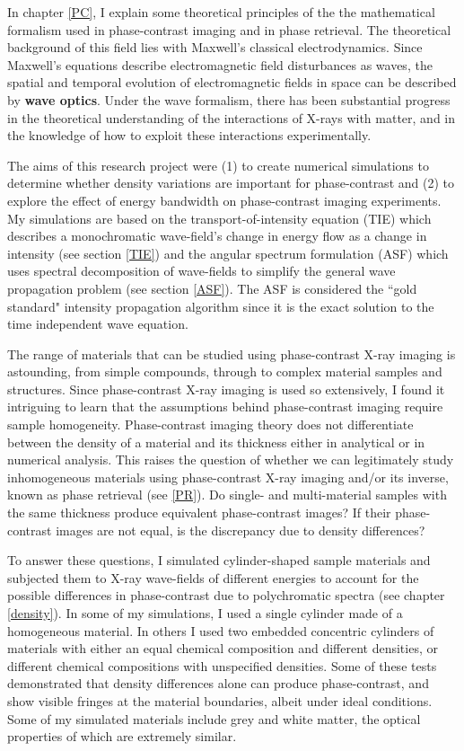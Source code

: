 \documentclass[10pt, a4paper, singlespacing]{report}
\begin{document}
In chapter \ref{PC}, I explain some theoretical principles of the the mathematical formalism used in phase-contrast imaging and in phase retrieval. The theoretical background of this field lies with Maxwell's classical electrodynamics\cite{PagsTutes}. Since Maxwell's equations describe electromagnetic field disturbances as waves, the spatial and temporal evolution of electromagnetic ﬁelds in space can be described by \textbf{wave optics}. Under the wave formalism, there has been substantial progress in the theoretical understanding of the interactions of X-rays with matter, and in the knowledge of how to exploit these interactions experimentally.

The aims of this research project were (1) to create numerical simulations to determine whether density variations are important for phase-contrast and (2) to explore the effect of energy bandwidth on phase-contrast imaging experiments. My simulations are based on the transport-of-intensity equation (TIE) which describes a monochromatic wave-field's change in energy flow as a change in intensity (see section \ref{TIE}) and the angular spectrum formulation (ASF) which uses spectral decomposition of wave-fields to simplify the general wave propagation problem (see section \ref{ASF}). The ASF is considered the ``gold standard" intensity propagation algorithm since it is the exact solution to the time independent wave equation.

The range of materials that can be studied using phase-contrast X-ray imaging is astounding, from simple compounds, through to complex material samples and structures. Since phase-contrast X-ray imaging is used so extensively, I found it intriguing to learn that the assumptions behind phase-contrast imaging require sample homogeneity. Phase-contrast imaging theory does not differentiate between the density of a material and its thickness either in analytical or in numerical analysis. This raises the question of whether we can legitimately study inhomogeneous materials using phase-contrast X-ray imaging and/or its inverse, known as phase retrieval (see \ref{PR}). Do single- and multi-material samples with the same thickness produce equivalent phase-contrast images? If their phase-contrast images are not equal, is the discrepancy due to density differences? 

To answer these questions, I simulated cylinder-shaped sample materials and subjected them to X-ray wave-fields of different energies to account for the possible differences in phase-contrast due to polychromatic spectra (see chapter \ref{density}). In some of my simulations, I used a single cylinder made of a homogeneous material. In others I used two embedded concentric cylinders of materials with either an equal chemical composition and different densities, or different chemical compositions with unspecified densities. Some of these tests demonstrated that density differences alone can produce phase-contrast, and show visible fringes at the material boundaries, albeit under ideal conditions. Some of my simulated materials include grey and white matter, the optical properties of which are extremely similar.
\end{document}
